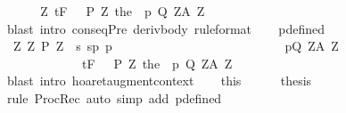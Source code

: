 \begin{isabellebody}
%
\isadelimproof
%
\endisadelimproof
%
\isatagproof
{}\isamarkupfalse%
\ {\isacharminus}\isanewline
\ \ \isamarkupfalse%
\ {\isachardoublequoteopen}{\isasymforall}{\isasymsigma}\ Z{\isachardot}\ {\isasymGamma}{\isacharcomma}{\isasymTheta}{\isasymturnstile}\isactrlsub t\isactrlbsub {\isacharslash}F\isactrlesub \ {\isacharparenleft}{\isacharbraceleft}{\isasymsigma}{\isacharbraceright}\ {\isasyminter}\ P\ Z{\isacharparenright}\ {\isacharparenleft}the\ {\isacharparenleft}{\isasymGamma}\ p{\isacharparenright}{\isacharparenright}\ {\isacharparenleft}Q\ Z{\isacharparenright}{\isacharcomma}{\isacharparenleft}A\ Z{\isacharparenright}{\isachardoublequoteclose}\isanewline
\ \ \ \ \isamarkupfalse%
\ {\isacharparenleft}blast\ intro{\isacharcolon}\ conseqPre\ deriv{\isacharunderscore}body\ {\isacharbrackleft}rule{\isacharunderscore}format{\isacharbrackright}{\isacharparenright}\isanewline
\ \ \isamarkupfalse%
\ p{\isacharunderscore}defined\ \isamarkupfalse%
\ {\isachardoublequoteopen}{\isasymforall}{\isasymsigma}\ Z{\isachardot}\ {\isasymGamma}{\isacharcomma}{\isasymTheta}{\isasymunion}{\isacharparenleft}{\isasymUnion}Z{\isachardot}\ {\isacharbraceleft}{\isacharparenleft}P\ Z\ {\isasyminter}\ {\isacharbraceleft}s{\isachardot}\ {\isacharparenleft}{\isacharparenleft}s{\isacharcomma}p{\isacharparenright}{\isacharcomma}\ {\isasymsigma}{\isacharcomma}p{\isacharparenright}\ {\isasymin}\ {\isacharbraceleft}{\isacharbraceright}{\isacharbraceright}{\isacharcomma}\isanewline
\ \ \ \ \ \ \ \ \ \ \ \ \ \ \ \ \ \ \ \ \ \ \ \ \ p{\isacharcomma}Q\ Z{\isacharcomma}A\ Z{\isacharparenright}{\isacharbraceright}{\isacharparenright}\isanewline
\ \ \ \ \ \ \ \ \ \ \ \ \ {\isasymturnstile}\isactrlsub t\isactrlbsub {\isacharslash}F\isactrlesub \ {\isacharparenleft}{\isacharbraceleft}{\isasymsigma}{\isacharbraceright}\ {\isasyminter}\ P\ Z{\isacharparenright}\ {\isacharparenleft}the\ {\isacharparenleft}{\isasymGamma}\ p{\isacharparenright}{\isacharparenright}\ {\isacharparenleft}Q\ Z{\isacharparenright}{\isacharcomma}{\isacharparenleft}A\ Z{\isacharparenright}{\isachardoublequoteclose}\isanewline
\ \ \ \ \isamarkupfalse%
\ {\isacharparenleft}blast\ intro{\isacharcolon}\ hoaret{\isacharunderscore}augment{\isacharunderscore}context{\isacharparenright}\isanewline
\ \ \isamarkupfalse%
\ this\ \ \isanewline
\ \ \isamarkupfalse%
\ {\isacharquery}thesis\ \isanewline
\ \ \ \ \isamarkupfalse%
\ {\isacharparenleft}rule\ ProcRec{}{\isacharparenright}\ {\isacharparenleft}auto\ simp\ add{\isacharcolon}\ p{\isacharunderscore}defined{\isacharparenright}\ \isanewline

\end{isabellebody}
